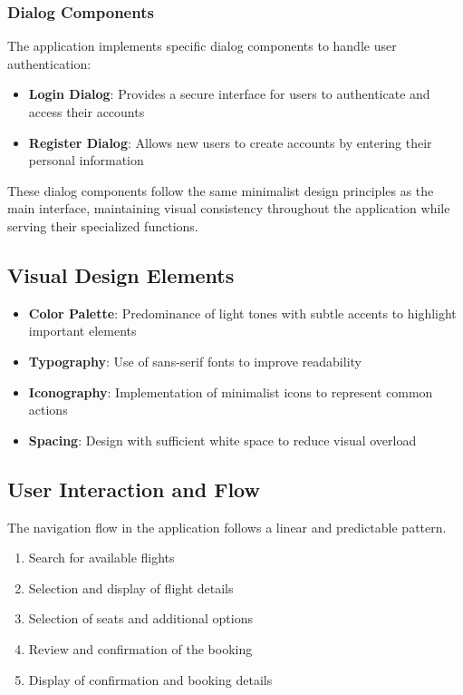 \documentclass[conference]{IEEEtran}
\begin{document}
    \subsubsection{Dialog Components}
    The application implements specific dialog components to handle user authentication:

    \begin{itemize}
        \item \textbf{Login Dialog}: Provides a secure interface for users to authenticate and access their accounts
        \item \textbf{Register Dialog}: Allows new users to create accounts by entering their personal information
    \end{itemize}

    These dialog components follow the same minimalist design principles as the main interface, maintaining visual consistency throughout the application while serving their specialized functions.

    \subsection{Visual Design Elements}

    \begin{itemize}
        \item \textbf{Color Palette}: Predominance of light tones with subtle accents to highlight important elements
        \item \textbf{Typography}: Use of sans-serif fonts to improve readability
        \item \textbf{Iconography}: Implementation of minimalist icons to represent common actions
        \item \textbf{Spacing}: Design with sufficient white space to reduce visual overload \end{itemize}

    \subsection{User Interaction and Flow}
    The navigation flow in the application follows a linear and predictable pattern.

    \begin{enumerate}
        \item Search for available flights
        \item Selection and display of flight details
        \item Selection of seats and additional options
        \item Review and confirmation of the booking
        \item Display of confirmation and booking details
    \end{enumerate}
\end{document}
